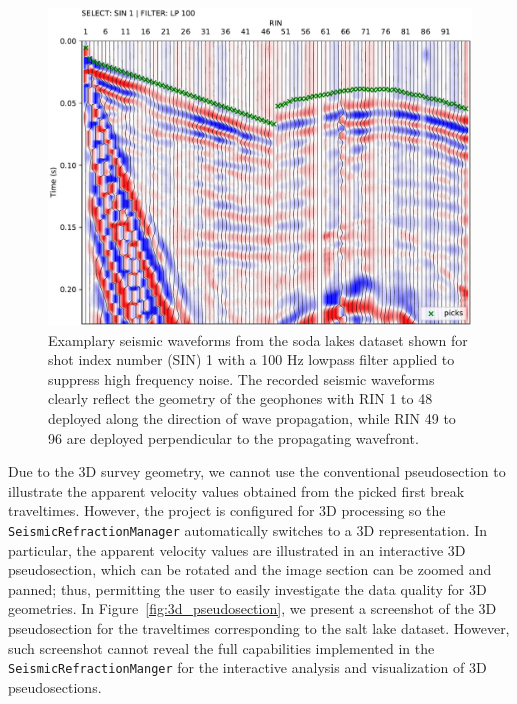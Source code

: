 \documentclass[a4paper,fleqn]{cas-sc}
\begin{document}
\begin{figure}
	\centering
	\includegraphics[width=.75\textwidth]{figures/sodalakes_sin1_lp100_picks_vd.pdf}
	\caption{Examplary seismic waveforms from the soda lakes dataset shown for shot index number (SIN) 1 with a 100 Hz lowpass filter applied to suppress high frequency noise. The recorded seismic waveforms clearly reflect the geometry of the geophones  with RIN 1 to 48 deployed along the direction of wave propagation, while RIN 49 to 96 are deployed perpendicular to the propagating wavefront.}
	\label{fig:3d_pickwindow}
\end{figure}

Due to the 3D survey geometry, we cannot use the conventional pseudosection to illustrate the apparent velocity values obtained from the picked first break traveltimes.
However, the project is configured for 3D processing so the \texttt{SeismicRefractionManager} automatically switches to a 3D representation. In particular, the apparent velocity values are illustrated in an interactive 3D pseudosection, which can be rotated and the image section can be zoomed and panned; thus, permitting the user to easily investigate the data quality for 3D geometries. In Figure~\ref{fig:3d_pseudosection}, we present a screenshot of the 3D pseudosection for the traveltimes corresponding to the salt lake dataset. However, such screenshot cannot reveal the full capabilities implemented in the \texttt{SeismicRefractionManger} for the interactive analysis and visualization of 3D pseudosections.
\end{document}
